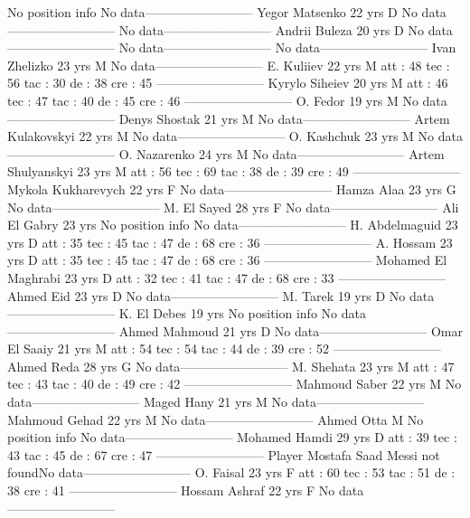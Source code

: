 No position info 
No data--------------------------
Yegor Matsenko  22 yrs 
D 
No data--------------------------
No data--------------------------
Andrii Buleza  20 yrs 
D 
No data--------------------------
No data--------------------------
No data--------------------------
Ivan Zhelizko  23 yrs 
M 
No data--------------------------
E. Kuliiev  22 yrs 
M 
 att : 48 
 tec : 56 
 tac : 30 
 de : 38 
 cre : 45 
--------------------------
Kyrylo Siheiev  20 yrs 
M 
 att : 46 
 tec : 47 
 tac : 40 
 de : 45 
 cre : 46 
--------------------------
O. Fedor  19 yrs 
M 
No data--------------------------
Denys Shostak  21 yrs 
M 
No data--------------------------
Artem Kulakovskyi  22 yrs 
M 
No data--------------------------
O. Kashchuk  23 yrs 
M 
No data--------------------------
O. Nazarenko  24 yrs 
M 
No data--------------------------
Artem Shulyanskyi  23 yrs 
M 
 att : 56 
 tec : 69 
 tac : 38 
 de : 39 
 cre : 49 
--------------------------
Mykola Kukharevych  22 yrs 
F 
No data--------------------------
Hamza Alaa  23 yrs 
G 
No data--------------------------
M. El Sayed  28 yrs 
F 
No data--------------------------
Ali El Gabry  23 yrs 
No position info 
No data--------------------------
H. Abdelmaguid  23 yrs 
D 
 att : 35 
 tec : 45 
 tac : 47 
 de : 68 
 cre : 36 
--------------------------
A. Hossam  23 yrs 
D 
 att : 35 
 tec : 45 
 tac : 47 
 de : 68 
 cre : 36 
--------------------------
Mohamed El Maghrabi  23 yrs 
D 
 att : 32 
 tec : 41 
 tac : 47 
 de : 68 
 cre : 33 
--------------------------
Ahmed Eid  23 yrs 
D 
No data--------------------------
M. Tarek  19 yrs 
D 
No data--------------------------
K. El Debes  19 yrs 
No position info 
No data--------------------------
Ahmed Mahmoud  21 yrs 
D 
No data--------------------------
Omar El Saaiy  21 yrs 
M 
 att : 54 
 tec : 54 
 tac : 44 
 de : 39 
 cre : 52 
--------------------------
Ahmed Reda  28 yrs 
G 
No data--------------------------
M. Shehata  23 yrs 
M 
 att : 47 
 tec : 43 
 tac : 40 
 de : 49 
 cre : 42 
--------------------------
Mahmoud Saber  22 yrs 
M 
No data--------------------------
Maged Hany  21 yrs 
M 
No data--------------------------
Mahmoud Gehad  22 yrs 
M 
No data--------------------------
Ahmed Otta  M 
No position info 
No data--------------------------
Mohamed Hamdi  29 yrs 
D 
 att : 39 
 tec : 43 
 tac : 45 
 de : 67 
 cre : 47 
--------------------------
Player Mostafa Saad Messi not foundNo data--------------------------
O. Faisal  23 yrs 
F 
 att : 60 
 tec : 53 
 tac : 51 
 de : 38 
 cre : 41 
--------------------------
Hossam Ashraf  22 yrs 
F 
No data--------------------------
